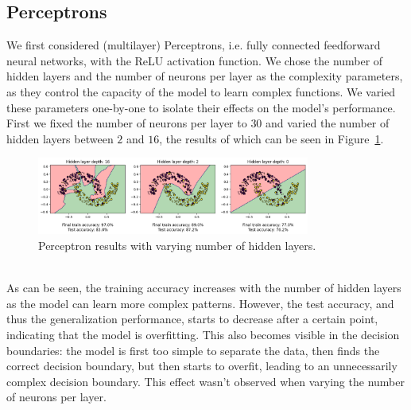 \documentclass[11pt]{article}
\begin{document}
\subsection{Perceptrons}
We first considered (multilayer) Perceptrons, i.e. fully connected feedforward neural networks, with the ReLU activation function. We chose the number of hidden layers and the number of neurons per layer as the complexity parameters, as they control the capacity of the model to learn complex functions. We varied these parameters one-by-one to isolate their effects on the model's performance. First we fixed the number of neurons per layer to $30$ and varied the number of hidden layers between $2$ and $16$, the results of which can be seen in Figure~\ref{fig:perceptron_results_layers}.\begin{figure}[h]
    \centering
    \includegraphics[width=0.8\textwidth]{img/perceptron-depth-result.png}
    \caption{Perceptron results with varying number of hidden layers.}
    \label{fig:perceptron_results_layers}
\end{figure}\\
As can be seen, the training accuracy increases with the number of hidden layers as the model can learn more complex patterns. However, the test accuracy, and thus the generalization performance, starts to decrease after a certain point, indicating that the model is overfitting. This also becomes visible in the decision boundaries: the model is first too simple to separate the data, then finds the correct decision boundary, but then starts to overfit, leading to an unnecessarily complex decision boundary. This effect wasn't observed when varying the number of neurons per layer.
\end{document}

